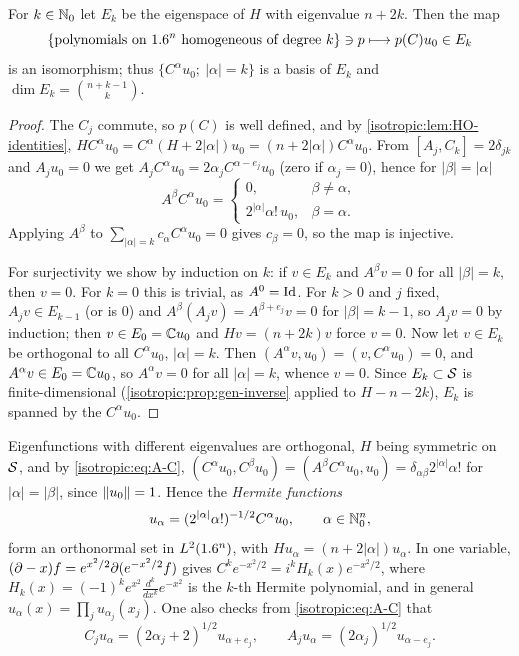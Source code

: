 \begin{proposition}\label{isotropic:prop:HO-eigenspaces}
For $k\in\mathbb{N}_0$ let $E_k$ be the eigenspace of $H$ with eigenvalue $n+2k$. Then
the map
\begin{equation*}
  \{\text{polynomials on }1.6^n\text{ homogeneous of degree }k\}\ni p\longmapsto p(C)u_0\in E_k
\end{equation*}
is an isomorphism; thus $\{C^\alpha u_0;\ |\alpha|=k\}$ is a basis of $E_k$ and
$\dim E_k=\binom{n+k-1}{k}$.
\end{proposition}
\begin{proof}
The $C_j$ commute, so $p(C)$ is well defined, and by
\cref{isotropic:lem:HO-identities}, $HC^\alpha u_0=C^\alpha(H+2|\alpha|)u_0=(n+2|\alpha|)C^\alpha u_0$.
From $[A_j,C_k]=2\delta_{jk}$ and $A_ju_0=0$ we get
$A_jC^\alpha u_0=2\alpha_jC^{\alpha-e_j}u_0$ (zero if $\alpha_j=0$), hence for
$|\beta|=|\alpha|$
\begin{equation}\label{isotropic:eq:A-C}
  A^\beta C^\alpha u_0=\begin{cases}0,&\beta\ne\alpha,\\2^{|\alpha|}\alpha!\,u_0,&\beta=\alpha .\end{cases}
\end{equation}
Applying $A^\beta$ to $\sum_{|\alpha|=k}c_\alpha C^\alpha u_0=0$ gives
$c_\beta=0$, so the map is injective.

For surjectivity we show by induction on $k$: if $v\in E_k$ and $A^\beta v=0$
for all $|\beta|=k$, then $v=0$. For $k=0$ this is trivial, as $A^0=\operatorname{Id}$.
For $k>0$ and $j$ fixed, $A_jv\in E_{k-1}$ (or is $0$) and
$A^\beta(A_jv)=A^{\beta+e_j}v=0$ for $|\beta|=k-1$, so $A_jv=0$ by induction;
then $v\in E_0=\mathbb{C} u_0$ and $Hv=(n+2k)v$ force $v=0$. Now let $v\in E_k$ be
orthogonal to all $C^\alpha u_0$, $|\alpha|=k$. Then
$(A^\alpha v,u_0)=(v,C^\alpha u_0)=0$, and $A^\alpha v\in E_0=\mathbb{C} u_0$, so
$A^\alpha v=0$ for all $|\alpha|=k$, whence $v=0$. Since $E_k\subset\mathcal{S}$ is
finite-dimensional (\cref{isotropic:prop:gen-inverse} applied to $H-n-2k$),
$E_k$ is spanned by the $C^\alpha u_0$.
\end{proof}

Eigenfunctions with different eigenvalues are orthogonal, $H$ being symmetric
on $\mathcal{S}$, and by \eqref{isotropic:eq:A-C},
$(C^\alpha u_0,C^\beta u_0)=(A^\beta C^\alpha u_0,u_0)=\delta_{\alpha\beta}2^{|\alpha|}\alpha!$
for $|\alpha|=|\beta|$, since $\lVert u_0\rVert=1$. Hence the \emph{Hermite functions}
\begin{equation}\label{isotropic:eq:hermite}
  u_\alpha=(2^{|\alpha|}\alpha!)^{-1/2}C^\alpha u_0,\qquad\alpha\in\mathbb{N}_0^n,
\end{equation}
form an orthonormal set in $L^2(1.6^n)$, with $Hu_\alpha=(n+2|\alpha|)u_\alpha$.
In one variable, $(\partial-x)f=e^{x^2/2}\partial(e^{-x^2/2}f)$ gives
$C^ke^{-x^2/2}=i^kH_k(x)e^{-x^2/2}$, where
$H_k(x)=(-1)^ke^{x^2}\frac{d^k}{dx^k}e^{-x^2}$ is the $k$-th Hermite polynomial,
and in general $u_\alpha(x)=\prod_ju_{\alpha_j}(x_j)$. One also checks
from \eqref{isotropic:eq:A-C} that
\begin{equation}\label{isotropic:eq:ladder}
  C_ju_\alpha=(2\alpha_j+2)^{1/2}u_{\alpha+e_j},\qquad A_ju_\alpha=(2\alpha_j)^{1/2}u_{\alpha-e_j}.
\end{equation}

